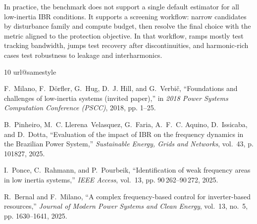 \documentclass[conference,letterpaper]{IEEEtran}
\begin{document}
In practice, the benchmark does not support a single default estimator for all
low-inertia IBR conditions. It supports a screening workflow: narrow
candidates by disturbance family and compute budget, then resolve the final
choice with the metric aligned to the protection objective. In that workflow,
ramps mostly test tracking bandwidth, jumps test recovery after
discontinuities, and harmonic-rich cases test robustness to leakage and
interharmonics.

\ifCLASSOPTIONcaptionsoff
  \newpage
\fi

\begin{thebibliography}{10}
\providecommand{\url}[1]{#1}
\csname url@samestyle\endcsname
\providecommand{\newblock}{\relax}
\providecommand{\bibinfo}[2]{#2}
\providecommand{\BIBentrySTDinterwordspacing}{\spaceskip=0pt\relax}
\providecommand{\BIBentryALTinterwordstretchfactor}{4}
\providecommand{\BIBentryALTinterwordspacing}{\spaceskip=\fontdimen2\font plus
\BIBentryALTinterwordstretchfactor\fontdimen3\font minus
  \fontdimen4\font\relax}
\providecommand{\BIBforeignlanguage}[2]{{%
\expandafter\ifx\csname l@#1\endcsname\relax
\typeout{** WARNING: IEEEtran.bst: No hyphenation pattern has been}%
\typeout{** loaded for the language `#1'. Using the pattern for}%
\typeout{** the default language instead.}%
\else
\language=\csname l@#1\endcsname
\fi
#2}}
\providecommand{\BIBdecl}{\relax}
\BIBdecl

F.~Milano, F.~D{\"o}rfler, G.~Hug, D.~J. Hill, and G.~Verbi{\v{c}},
  ``Foundations and challenges of low-inertia systems (invited paper),'' in
  \emph{2018 Power Systems Computation Conference (PSCC)}, 2018, pp. 1--25.

B.~Pinheiro, M.~C. Llerena~Velasquez, G.~Faria, A.~F.~C. Aquino, D.~Issicaba,
  and D.~Dotta, ``Evaluation of the impact of {IBR} on the frequency dynamics
  in the {Brazilian Power System},'' \emph{Sustainable Energy, Grids and
  Networks}, vol.~43, p. 101827, 2025.

I.~Ponce, C.~Rahmann, and P.~Pourbeik, ``Identification of weak frequency areas
  in low inertia systems,'' \emph{IEEE Access}, vol.~13, pp. 90\,262--90\,272,
  2025.

R.~Bernal and F.~Milano, ``A complex frequency-based control for inverter-based
  resources,'' \emph{Journal of Modern Power Systems and Clean Energy},
  vol.~13, no.~5, pp. 1630--1641, 2025.


\end{thebibliography}
\end{document}
